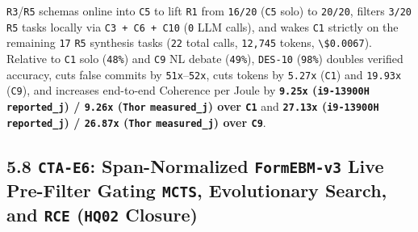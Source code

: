 \documentclass[10pt,letterpaper]{article}
\begin{document}
\begin{enumerate}
  \texttt{R3}/\allowbreak{}\texttt{R5} schemas online into \texttt{C5} to lift
  \texttt{R1} from \texttt{16/20} (\texttt{C5} solo) to \texttt{20/20},
  filters \texttt{3/20} \texttt{R5} tasks locally via
  \texttt{C3\ +\ C6\ +\ C10} (\texttt{0} LLM calls), and wakes
  \texttt{C1} strictly on the remaining \texttt{17} \texttt{R5}
  synthesis tasks (\texttt{22} total calls, \texttt{12,745} tokens,
  \texttt{\textbackslash{}\$0.0067}). Relative to \texttt{C1} solo
  (\texttt{48\%}) and \texttt{C9} NL debate (\texttt{49\%}),
  \texttt{DES-10} (\texttt{98\%}) doubles verified accuracy, cuts false
  commits by \texttt{51x}--\texttt{52x}, cuts tokens by \texttt{5.27x}
  (\texttt{C1}) and \texttt{19.93x} (\texttt{C9}), and increases
  end-to-end Coherence per Joule by \textbf{\texttt{9.25x}
  (\texttt{i9-13900H} \texttt{reported\_\allowbreak{}j}) / \texttt{9.26x}
  (\texttt{Thor} \texttt{measured\_\allowbreak{}j}) over \texttt{C1}} and
  \textbf{\texttt{27.13x} (\texttt{i9-13900H} \texttt{reported\_\allowbreak{}j}) /
  \texttt{26.87x} (\texttt{Thor} \texttt{measured\_\allowbreak{}j}) over
  \texttt{C9}}.
\end{enumerate}

\subsection{\texorpdfstring{5.8 \texttt{CTA-E6}: Span-Normalized
\texttt{FormEBM-v3} Live Pre-Filter Gating \texttt{MCTS}, Evolutionary
Search, and \texttt{RCE} (\texttt{HQ02}
Closure)}{5.8 CTA-E6: Span-Normalized FormEBM-v3 Live Pre-Filter Gating MCTS, Evolutionary Search, and RCE (HQ02 Closure)}}\label{cta-e6-span-normalized-formebm-v3-live-pre-filter-gating-mcts-evolutionary-search-and-rce-hq02-closure}
\end{document}
